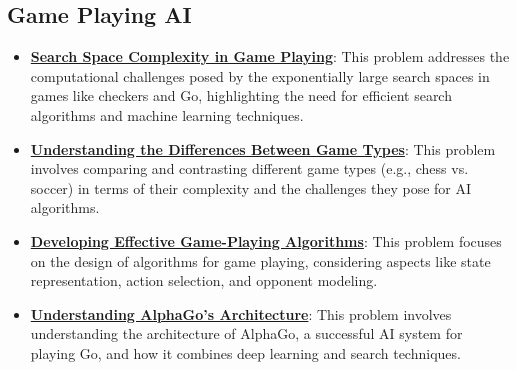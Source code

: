 \documentclass{article}%
\begin{document}
\subsection{Game Playing AI}%
\label{subsec:GamePlayingAI}%
\begin{itemize}[leftmargin=*]%
\item \href{https://purdue.brightspace.com/d2l/common/assets/pdfjs-d2l-dist/1.0.14-legacy/web/viewer.html?file=\%2Fcontent\%2Fenforced\%2F1095467-wl.202510.CS.24300.001\%2F02L2-Intro.pdf\%3Fou\%3D1095467\&lang=en-us\&container=d2l-fileviewer-rendered-pdf\&fullscreen=d2l-fileviewer-rendered-pdf-dialog\&height=667#page=11}{\textbf{Search Space Complexity in Game Playing}}: This problem addresses the computational challenges posed by the exponentially large search spaces in games like checkers and Go, highlighting the need for efficient search algorithms and machine learning techniques.%
\item \href{https://purdue.brightspace.com/d2l/common/assets/pdfjs-d2l-dist/1.0.14-legacy/web/viewer.html?file=\%2Fcontent\%2Fenforced\%2F1095467-wl.202510.CS.24300.001\%2F02L2-Intro.pdf\%3Fou\%3D1095467\&lang=en-us\&container=d2l-fileviewer-rendered-pdf\&fullscreen=d2l-fileviewer-rendered-pdf-dialog\&height=667#page=27}{\textbf{Understanding the Differences Between Game Types}}: This problem involves comparing and contrasting different game types (e.g., chess vs. soccer) in terms of their complexity and the challenges they pose for AI algorithms.%
\item \href{https://purdue.brightspace.com/d2l/common/assets/pdfjs-d2l-dist/1.0.14-legacy/web/viewer.html?file=\%2Fcontent\%2Fenforced\%2F1095467-wl.202510.CS.24300.001\%2F02L2-Intro.pdf\%3Fou\%3D1095467\&lang=en-us\&container=d2l-fileviewer-rendered-pdf\&fullscreen=d2l-fileviewer-rendered-pdf-dialog\&height=667#page=24}{\textbf{Developing Effective Game-Playing Algorithms}}: This problem focuses on the design of algorithms for game playing, considering aspects like state representation, action selection, and opponent modeling.%
\item \href{https://purdue.brightspace.com/d2l/common/assets/pdfjs-d2l-dist/1.0.14-legacy/web/viewer.html?file=\%2Fcontent\%2Fenforced\%2F1095467-wl.202510.CS.24300.001\%2F02L2-Intro.pdf\%3Fou\%3D1095467\&lang=en-us\&container=d2l-fileviewer-rendered-pdf\&fullscreen=d2l-fileviewer-rendered-pdf-dialog\&height=667#page=50}{\textbf{Understanding AlphaGo's Architecture}}: This problem involves understanding the architecture of AlphaGo, a successful AI system for playing Go, and how it combines deep learning and search techniques.%
\end{itemize}
\end{document}
